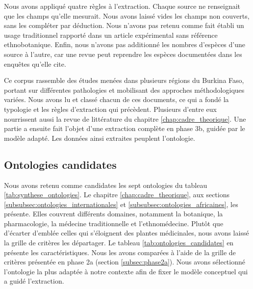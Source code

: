 Nous avons appliqué quatre règles à l'extraction. Chaque source ne renseignait que les champs qu'elle mesurait. Nous avons laissé vides les champs non couverts, sans les compléter par déduction. Nous n'avons pas retenu comme fait établi un usage traditionnel rapporté dans un article expérimental sans référence ethnobotanique. Enfin, nous n'avons pas additionné les nombres d'espèces d'une source à l'autre, car une revue peut reprendre les espèces documentées dans les enquêtes qu'elle cite.

Ce corpus rassemble des études menées dans plusieurs régions du Burkina Faso, portant sur différentes pathologies et mobilisant des approches méthodologiques variées. Nous avons lu et classé chacun de ces documents, ce qui a fondé la typologie et les règles d'extraction qui précèdent. Plusieurs d'entre eux nourrissent aussi la revue de littérature du chapitre \ref{chap:cadre_theorique}. Une partie a ensuite fait l'objet d'une extraction complète en phase 3b, guidée par le modèle adapté. Les données ainsi extraites peuplent l'ontologie.


\subsection{Ontologies candidates}
\label{subsec:ontologies_candidates}

Nous avons retenu comme candidates les sept ontologies du tableau \ref{tab:synthese_ontologies}. Le chapitre \ref{chap:cadre_theorique}, aux sections \ref{subsubsec:ontologies_internationales} et \ref{subsubsec:ontologies_africaines}, les présente. Elles couvrent différents domaines, notamment la botanique, la pharmacologie, la médecine traditionnelle et l'ethnomédecine. Plutôt que d'écarter d'emblée celles qui s'éloignent des plantes médicinales, nous avons laissé la grille de critères les départager. Le tableau \ref{tab:ontologies_candidates} en présente les caractéristiques. Nous les avons comparées à l'aide de la grille de critères présentée en phase 2a (section \ref{subsec:phase2a}). Nous avons sélectionné l'ontologie la plus adaptée à notre contexte afin de fixer le modèle conceptuel qui a guidé l'extraction.

